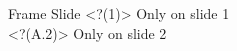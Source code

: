 \documentclass {beamer}
\begin{document}
\begin{test}[banner=FRAME, dedbug]
\begin{frame}[fragile]
  {\Large Frame \insertframenumber}
  {\Large Slide \insertslidenumber}
\visible<?(1)> {Only on slide 1}\\
\visible<?(A.2)> {Only on slide 2}\\
\end{frame}
\end{test}
\end{document}
